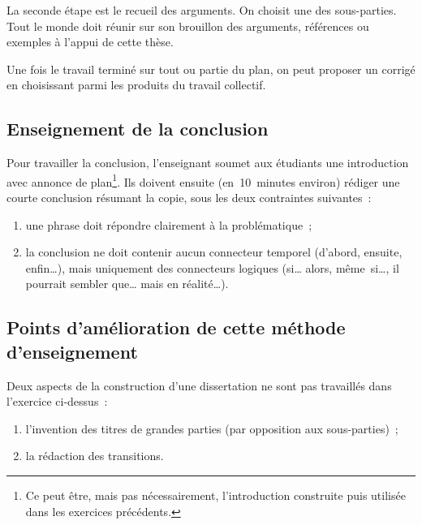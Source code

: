 \documentclass[a4paper,12pt]{article}
\begin{document}
La seconde étape est le recueil des arguments. On choisit une des
sous-parties. Tout le monde doit réunir sur son brouillon des arguments,
références ou exemples à l'appui de cette thèse. 

Une fois le travail terminé sur tout ou partie du plan, on peut proposer
un corrigé en choisissant parmi les produits du travail collectif.


\subsection{Enseignement de la conclusion}
\label{sec:org32329b3}

Pour travailler la conclusion, l'enseignant soumet aux étudiants une
introduction avec annonce de plan\footnote{Ce peut être, mais pas nécessairement, l'introduction construite
puis utilisée dans les exercices précédents.}. Ils doivent ensuite
(en 10 minutes environ) rédiger une courte conclusion résumant la copie,
sous les deux contraintes suivantes : 

\begin{enumerate}
\item une phrase doit répondre clairement à la problématique ;
\item la conclusion ne doit contenir aucun connecteur temporel (d'abord,
ensuite, enfin\ldots{}), mais uniquement des connecteurs logiques (si\ldots{}
alors, même si\ldots{}, il pourrait sembler que\ldots{} mais en réalité\ldots{}).
\end{enumerate}


\subsection{Points d'amélioration de cette méthode d'enseignement}
\label{sec:org003e704}

Deux aspects de la construction d'une dissertation ne sont pas
travaillés dans l'exercice ci-dessus : 
\begin{enumerate}
\item l'invention des titres de grandes parties (par opposition aux
sous-parties) ;
\item la rédaction des transitions.
\end{enumerate}
\end{document}
